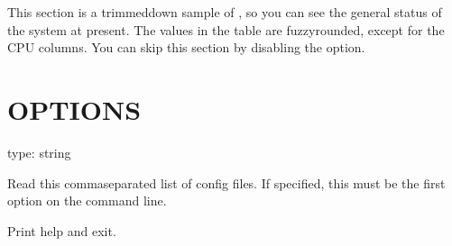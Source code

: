 \documentclass[letterpaper,10pt,english]{sphinxmanual}
\begin{document}
\sphinxAtStartPar
This section is a trimmed\sphinxhyphen{}down sample of , so you can see the
general status of the system at present. The values in the table are
fuzzy\sphinxhyphen{}rounded, except for the CPU columns.  You can skip this section by
disabling the {\hyperref[\detokenize{mariadb-system-summary:cmdoption-mariadb-system-summary-summarize-processes}]{}} option.


\section{OPTIONS}
\label{\detokenize{mariadb-system-summary:options}}

\begin{fulllineitems}
\label{\detokenize{mariadb-system-summary:cmdoption-mariadb-system-summary-config}}
\sphinxAtStartPar
type: string

\sphinxAtStartPar
Read this comma\sphinxhyphen{}separated list of config files.  If specified, this must be the
first option on the command line.

\end{fulllineitems}


\begin{fulllineitems}
\label{\detokenize{mariadb-system-summary:cmdoption-mariadb-system-summary-help}}
\sphinxAtStartPar
Print help and exit.

\end{fulllineitems}
\end{document}
